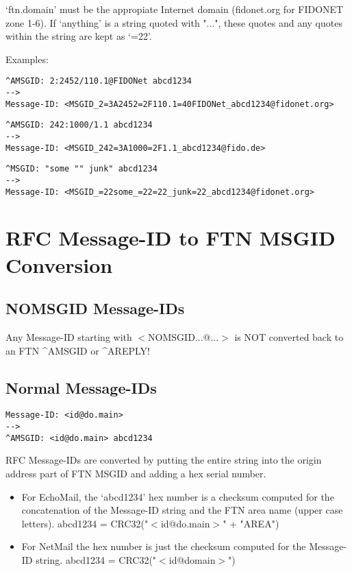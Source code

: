 \documentclass[letterpaper]{article}
\begin{document}
`ftn.domain' must be the appropiate Internet domain (fidonet.org for FIDONET zone 1-6). If `anything' is a string quoted with "...", these quotes and any quotes within the string are kept as `=22'.

Examples:  
\begin{verbatim}
^AMSGID: 2:2452/110.1@FIDONet abcd1234 
--> 
Message-ID: <MSGID_2=3A2452=2F110.1=40FIDONet_abcd1234@fidonet.org>
\end{verbatim}




\begin{verbatim}
^AMSGID: 242:1000/1.1 abcd1234 
--> 
Message-ID: <MSGID_242=3A1000=2F1.1_abcd1234@fido.de>
\end{verbatim}




\begin{verbatim}
^MSGID: "some "" junk" abcd1234 
--> 
Message-ID: <MSGID_=22some_=22=22_junk=22_abcd1234@fidonet.org>
\end{verbatim}



\section{RFC Message-ID to FTN MSGID Conversion}




\subsection{NOMSGID Message-IDs }



Any Message-ID starting with $<$NOMSGID...@...$>$ is NOT converted back to an FTN \^{}AMSGID or \^{}AREPLY! 


\subsection{Normal Message-IDs }

\begin{verbatim}
Message-ID: <id@do.main> 
--> 
^AMSGID: <id@do.main> abcd1234 
\end{verbatim}


RFC Message-IDs are converted by putting the entire string into the origin address part of FTN MSGID and adding a hex serial number.
\begin{itemize}
\item For EchoMail, the `abcd1234' hex number is a checksum computed for the concatenation of the Message-ID string and the FTN area name (upper case letters).
abcd1234 = CRC32("$<$id@do.main$>$" + "AREA")
\item For NetMail the hex number is just the checksum computed for the Message-ID string. 
abcd1234 = CRC32("$<$id@domain$>$")
\end{itemize}
\end{document}
